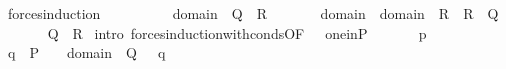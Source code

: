\begin{isabellebody}
\ forces{\isacharunderscore}{\kern0pt}induction{\isacharcolon}{\kern0pt}\isanewline
\ \ \isanewline
\ \ \ \ {\isachardoublequoteopen}{\isasymAnd}{\isasymtau}\ {\isasymtheta}{\isachardot}{\kern0pt}\ {\isasymlbrakk}{\isasymAnd}{\isasymsigma}{\isachardot}{\kern0pt}\ {\isasymsigma}{\isasymin}domain{\isacharparenleft}{\kern0pt}{\isasymtheta}{\isacharparenright}{\kern0pt}\ {\isasymLongrightarrow}\ Q{\isacharparenleft}{\kern0pt}{\isasymtau}{\isacharcomma}{\kern0pt}{\isasymsigma}{\isacharparenright}{\kern0pt}{\isasymrbrakk}\ {\isasymLongrightarrow}\ R{\isacharparenleft}{\kern0pt}{\isasymtau}{\isacharcomma}{\kern0pt}{\isasymtheta}{\isacharparenright}{\kern0pt}{\isachardoublequoteclose}\isanewline
\ \ \ \ {\isachardoublequoteopen}{\isasymAnd}{\isasymtau}\ {\isasymtheta}{\isachardot}{\kern0pt}\ {\isasymlbrakk}{\isasymAnd}{\isasymsigma}{\isachardot}{\kern0pt}\ {\isasymsigma}{\isasymin}domain{\isacharparenleft}{\kern0pt}{\isasymtau}{\isacharparenright}{\kern0pt}\ {\isasymunion}\ domain{\isacharparenleft}{\kern0pt}{\isasymtheta}{\isacharparenright}{\kern0pt}\ {\isasymLongrightarrow}\ R{\isacharparenleft}{\kern0pt}{\isasymsigma}{\isacharcomma}{\kern0pt}{\isasymtau}{\isacharparenright}{\kern0pt}\ {\isasymand}\ R{\isacharparenleft}{\kern0pt}{\isasymsigma}{\isacharcomma}{\kern0pt}{\isasymtheta}{\isacharparenright}{\kern0pt}{\isasymrbrakk}\ {\isasymLongrightarrow}\ Q{\isacharparenleft}{\kern0pt}{\isasymtau}{\isacharcomma}{\kern0pt}{\isasymtheta}{\isacharparenright}{\kern0pt}{\isachardoublequoteclose}\isanewline
\ \ \isanewline
\ \ \ \ {\isachardoublequoteopen}Q{\isacharparenleft}{\kern0pt}{\isasymtau}{\isacharcomma}{\kern0pt}{\isasymtheta}{\isacharparenright}{\kern0pt}\ {\isasymand}\ R{\isacharparenleft}{\kern0pt}{\isasymtau}{\isacharcomma}{\kern0pt}{\isasymtheta}{\isacharparenright}{\kern0pt}{\isachardoublequoteclose}\isanewline
%
\isadelimproof
%
\endisadelimproof
%
\isatagproof
{}\isamarkupfalse%
\ {\isacharparenleft}{\kern0pt}intro\ forces{\isacharunderscore}{\kern0pt}induction{\isacharunderscore}{\kern0pt}with{\isacharunderscore}{\kern0pt}conds{\isacharbrackleft}{\kern0pt}OF\ {\isacharunderscore}{\kern0pt}\ {\isacharunderscore}{\kern0pt}\ one{\isacharunderscore}{\kern0pt}in{\isacharunderscore}{\kern0pt}P\ {\isacharbrackright}{\kern0pt}{\isacharparenright}{\kern0pt}\isanewline
\ \ \isamarkupfalse%
\ {\isasymtau}\ {\isasymtheta}\ p\ \isanewline
\ \ \isamarkupfalse%
\ {\isachardoublequoteopen}q\ {\isasymin}\ P\ {\isasymLongrightarrow}\ {\isasymsigma}\ {\isasymin}\ domain{\isacharparenleft}{\kern0pt}{\isasymtheta}{\isacharparenright}{\kern0pt}\ {\isasymLongrightarrow}\ Q{\isacharparenleft}{\kern0pt}{\isasymtau}{\isacharcomma}{\kern0pt}\ {\isasymsigma}{\isacharparenright}{\kern0pt}{\isachardoublequoteclose}\ \ q\ {\isasymsigma}\isanewline

\end{isabellebody}
